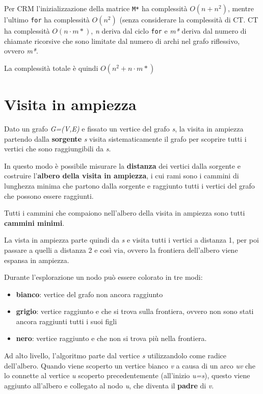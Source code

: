 Per \textsc{CRM} l'inizializzazione della matrice \texttt{M*} ha
complessità $O(n+n^2)$, mentre l'ultimo
\texttt{for} ha complessità $O(n^2)$ (senza considerare la complessità
di \textsc{CT}. \textsc{CT} ha complessità $O(n \cdot m* )$, \emph{n}
deriva dal ciclo \texttt{for} e \emph{m*} deriva dal numero di chiamate
ricorsive che sono limitate dal numero di archi nel grafo riflessivo,
ovvero \emph{m*}.

La complessità totale è quindi $O(n^2 + n \cdot m*)$

\section{Visita in ampiezza}\label{visita-in-ampiezza}

Dato un grafo \emph{G=(V,E)} e fissato un vertice del grafo \emph{s}, la
visita in ampiezza partendo dalla \textbf{sorgente} \emph{s} visita
sistematicamente il grafo per scoprire tutti i vertici che sono
raggiungibili da \emph{s}.

In questo modo è possibile misurare la \textbf{distanza} dei vertici
dalla sorgente e costruire l'\textbf{albero della visita in ampiezza}, i
cui rami sono i cammini di lunghezza minima che partono dalla sorgente e
raggiunto tutti i vertici del grafo che possono essere raggiunti.

Tutti i cammini che compaiono nell'albero della visita in ampiezza sono
tutti \textbf{cammini minimi}.

La vista in ampiezza parte quindi da \emph{s} e visita tutti i vertici a
distanza 1, per poi passare a quelli a distanza 2 e così via, ovvero la
frontiera dell'albero viene espansa in ampiezza.

Durante l'esplorazione un nodo può essere colorato in tre modi:

\begin{itemize}
\item
  \textbf{bianco}: vertice del grafo non ancora raggiunto
\item
  \textbf{grigio}: vertice raggiunto e che si trova sulla frontiera,
  ovvero non sono stati ancora raggiunti tutti i suoi figli
\item
  \textbf{nero}: vertice raggiunto e che non si trova più nella
  frontiera.
\end{itemize}

Ad alto livello, l'algoritmo parte dal vertice \emph{s} utilizzandolo
come radice dell'albero. Quando viene scoperto un vertice bianco
\emph{v} a causa di un arco \emph{uv} che lo connette al vertice \emph{u}
scoperto precedentemente (all'inizio \emph{u=s}), questo viene aggiunto
all'albero e collegato al nodo \emph{u}, che diventa il \textbf{padre}
di \emph{v}.

